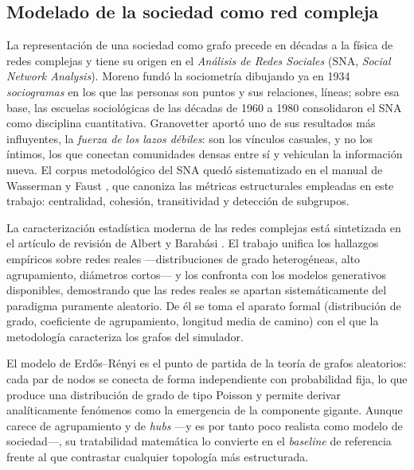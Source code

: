 \documentclass[12pt]{extarticle}
\numberwithin{equation}{section}
\begin{document}
\begin{refsection}
\subsection{Modelado de la sociedad como red compleja}

La representaci\'on de una sociedad como grafo precede en d\'ecadas a la f\'isica de redes complejas y tiene su origen en el \emph{An\'alisis de Redes Sociales} (SNA, \emph{Social Network Analysis}). Moreno \cite{Moreno1934} fund\'o la sociometr\'ia dibujando ya en 1934 \emph{sociogramas} en los que las personas son puntos y sus relaciones, l\'ineas; sobre esa base, las escuelas sociol\'ogicas de las d\'ecadas de 1960 a 1980 consolidaron el SNA como disciplina cuantitativa. Granovetter \cite{Granovetter1973} aport\'o uno de sus resultados m\'as influyentes, la \emph{fuerza de los lazos d\'ebiles}: son los v\'inculos casuales, y no los \'intimos, los que conectan comunidades densas entre s\'i y vehiculan la informaci\'on nueva. El corpus metodol\'ogico del SNA qued\'o sistematizado en el manual de Wasserman y Faust \cite{WassermanFaust1994}, que canoniza las m\'etricas estructurales empleadas en este trabajo: centralidad, cohesi\'on, transitividad y detecci\'on de subgrupos.

La caracterizaci\'on estad\'istica moderna de las redes complejas est\'a sintetizada en el art\'iculo de revisi\'on de Albert y Barab\'asi \cite{AlbertBarabasi2002}. El trabajo unifica los hallazgos emp\'iricos sobre redes reales —distribuciones de grado heterog\'eneas, alto agrupamiento, di\'ametros cortos— y los confronta con los modelos generativos disponibles, demostrando que las redes reales se apartan sistem\'aticamente del paradigma puramente aleatorio. De \'el se toma el aparato formal (distribuci\'on de grado, coeficiente de agrupamiento, longitud media de camino) con el que la metodolog\'ia caracteriza los grafos del simulador.

El modelo de Erd\H{o}s--R\'enyi \cite{ErdosRenyi1960} es el punto de partida de la teor\'ia de grafos aleatorios: cada par de nodos se conecta de forma independiente con probabilidad fija, lo que produce una distribuci\'on de grado de tipo Poisson y permite derivar anal\'iticamente fen\'omenos como la emergencia de la componente gigante. Aunque carece de agrupamiento y de \emph{hubs} —y es por tanto poco realista como modelo de sociedad—, su tratabilidad matem\'atica lo convierte en el \emph{baseline} de referencia frente al que contrastar cualquier topolog\'ia m\'as estructurada.


\end{refsection}
\end{document}
